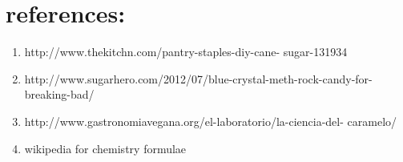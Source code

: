 \documentclass[a4paper,10pt]{article}
\begin{document}
\section*{references:}
\begin{enumerate}
  \item http://www.thekitchn.com/pantry-staples-diy-cane-
sugar-131934 
  \item http://www.sugarhero.com/2012/07/blue-crystal-meth-rock-candy-for-
breaking-bad/
  \item http://www.gastronomiavegana.org/el-laboratorio/la-ciencia-del-
caramelo/
  \item wikipedia for chemistry formulae
\end{enumerate}


 
 
\end{document}
